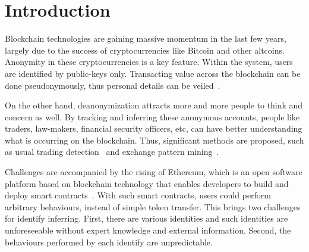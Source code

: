 \section{Introduction}
Blockchain technologies are gaining massive momentum in the last few years, largely due to the success of cryptocurrencies like Bitcoin and other altcoins. Anonymity in these cryptocurrencies is a key feature. Within the system, users are identified by public-keys only. Transacting value across the blockchain can be done pseudonymously, thus personal details can be veiled~\cite{reid2013analysis}.

On the other hand, deanonymization attracts more and more people to think and concern as well. By tracking and inferring these anonymous accounts, people like traders, law-makers, financial security officers, etc, can have better understanding what is occurring on the blockchain. Thus, significant methods are proposed, such as usual trading detection~\cite{maesa2016analysis} and exchange pattern mining~\cite{ranshous2017exchange}. 

Challenges are accompanied by the rising of Ethereum, which is an open software platform based on blockchain technology that enables developers to build and deploy smart contracts~\cite{buterin2013ethereum}.
With such smart contracts, users could perform arbitrary behaviours, instead of simple token transfer. This brings two challenges for identify inferring. First, there are various identities and such identities are unforeseeable without expert knowledge and external information. Second, the behaviours performed by each identify are unpredictable.

